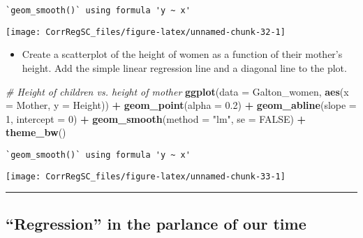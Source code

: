 \documentclass[
]{book}
\newenvironment{Shaded}{\begin{snugshade}}{\end{snugshade}}
\newcommand{\CommentTok}[1]{\textcolor[rgb]{0.56,0.35,0.01}{\textit{#1}}}
\newcommand{\DataTypeTok}[1]{\textcolor[rgb]{0.13,0.29,0.53}{#1}}
\newcommand{\DecValTok}[1]{\textcolor[rgb]{0.00,0.00,0.81}{#1}}
\newcommand{\FloatTok}[1]{\textcolor[rgb]{0.00,0.00,0.81}{#1}}
\newcommand{\KeywordTok}[1]{\textcolor[rgb]{0.13,0.29,0.53}{\textbf{#1}}}
\newcommand{\NormalTok}[1]{#1}
\newcommand{\OperatorTok}[1]{\textcolor[rgb]{0.81,0.36,0.00}{\textbf{#1}}}
\newcommand{\OtherTok}[1]{\textcolor[rgb]{0.56,0.35,0.01}{#1}}
\newcommand{\StringTok}[1]{\textcolor[rgb]{0.31,0.60,0.02}{#1}}
\providecommand{\tightlist}{%
  \setlength{\itemsep}{0pt}\setlength{\parskip}{0pt}}
\begin{document}
\begin{verbatim}
`geom_smooth()` using formula 'y ~ x'
\end{verbatim}

\begin{center}\texttt{[image: CorrRegSC\_files/figure-latex/unnamed-chunk-32-1]} \end{center}

\begin{itemize}
\tightlist
\item
  Create a scatterplot of the height of women as a function of their mother's height. Add the simple linear regression line and a diagonal line to the plot.
\end{itemize}

\begin{Shaded}
\begin{Highlighting}[]
\CommentTok{# Height of children vs. height of mother}
\KeywordTok{ggplot}\NormalTok{(}\DataTypeTok{data =}\NormalTok{ Galton_women, }\KeywordTok{aes}\NormalTok{(}\DataTypeTok{x =}\NormalTok{ Mother, }\DataTypeTok{y =}\NormalTok{ Height)) }\OperatorTok{+}
\StringTok{  }\KeywordTok{geom_point}\NormalTok{(}\DataTypeTok{alpha =} \FloatTok{0.2}\NormalTok{) }\OperatorTok{+}\StringTok{ }
\StringTok{  }\KeywordTok{geom_abline}\NormalTok{(}\DataTypeTok{slope =} \DecValTok{1}\NormalTok{, }\DataTypeTok{intercept =} \DecValTok{0}\NormalTok{) }\OperatorTok{+}\StringTok{ }
\StringTok{  }\KeywordTok{geom_smooth}\NormalTok{(}\DataTypeTok{method =} \StringTok{"lm"}\NormalTok{, }\DataTypeTok{se =} \OtherTok{FALSE}\NormalTok{) }\OperatorTok{+}\StringTok{ }
\StringTok{  }\KeywordTok{theme_bw}\NormalTok{()}
\end{Highlighting}
\end{Shaded}

\begin{verbatim}
`geom_smooth()` using formula 'y ~ x'
\end{verbatim}

\begin{center}\texttt{[image: CorrRegSC\_files/figure-latex/unnamed-chunk-33-1]} \end{center}

\begin{center}\rule{0.5\linewidth}{0.5pt}\end{center}

\hypertarget{regression-in-the-parlance-of-our-time}{%
\subsection*{``Regression'' in the parlance of our time}\label{regression-in-the-parlance-of-our-time}}
\end{document}
